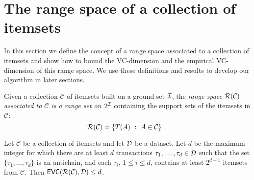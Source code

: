 \section{The range space of a collection of itemsets}\label{sec:range}
In this section we define the concept of a range space associated to a
collection of itemsets and show how to bound the VC-dimension and the
empirical VC-dimension of this range space. We use these definitions and results
to develop our algorithm in later sections.

\begin{definition}\label{def:rangeset}
Given a collection $\mathcal{C}$ of itemsets built on a ground set ${\cal I}$, the
\emph{range space $\mathcal{R}(\mathcal{C})$ associated to $\mathcal{C}$ is a range
set on $2^{\cal I}$} containing the support sets of the itemsets in $\mathcal{C}$:
\[\mathcal{R}(\mathcal{C})=\{T(A) ~:~ A\in\mathcal{C}\}\enspace.\]
\end{definition}


\begin{theorem}\label{lem:evcdimupbound}
  Let $\mathcal{C}$ be a collection of itemsets and let ${\cal D}$ be a dataset. Let
  $d$ be the maximum integer for which there are at least $d$
  transactions $\tau_1,\dotsc,\tau_d\in {\cal D}$ such that the set
  $\{\tau_1,\dotsc,\tau_d\}$ is an antichain, and each $\tau_i$, $1\le i\le d$,
  contains at least $2^{d-1}$ itemsets from $\mathcal{C}$. 
  Then $\mathsf{EVC}(\mathcal{R}(\mathcal{C}),{\cal D})\le d$.
\end{theorem}

